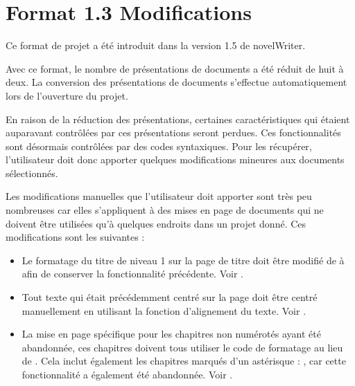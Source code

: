 \documentclass[a4paper,11pt,french]{sphinxmanual}
\begin{document}
\section{Format 1.3 Modifications}
\label{\detokenize{more_projectformat:format-1-3-changes}}\label{\detokenize{more_projectformat:a-prjfmt-1-3}}
\sphinxAtStartPar
Ce format de projet a été introduit dans la version 1.5 de novelWriter.

\sphinxAtStartPar
Avec ce format, le nombre de présentations de documents a été réduit de huit à deux. La conversion des présentations de documents s’effectue automatiquement lors de l’ouverture du projet.

\sphinxAtStartPar
En raison de la réduction des présentations, certaines caractéristiques qui étaient auparavant contrôlées par ces présentations seront perdues. Ces fonctionnalités sont désormais contrôlées par des codes syntaxiques. Pour les récupérer, l’utilisateur doit donc apporter quelques modifications mineures aux documents sélectionnés.

\sphinxAtStartPar
Les modifications manuelles que l’utilisateur doit apporter sont très peu nombreuses car elles s’appliquent à des mises en page de documents qui ne doivent être utilisées qu’à quelques endroits dans un projet donné. Ces modifications sont les suivantes :

\sphinxAtStartPar
{}
\begin{itemize}
\item {} 
\sphinxAtStartPar
Le formatage du titre de niveau 1 sur la page de titre doit être modifié de  à  afin de conserver la fonctionnalité précédente. Voir {\hyperref[\detokenize{usage_format:a-fmt-head}]{}}.

\item {} 
\sphinxAtStartPar
Tout texte qui était précédemment centré sur la page doit être centré manuellement en utilisant la fonction d’alignement du texte. Voir {\hyperref[\detokenize{usage_format:a-fmt-align}]{}}.

\end{itemize}

\sphinxAtStartPar
{}
\begin{itemize}
\item {} 
\sphinxAtStartPar
La mise en page spécifique pour les chapitres non numérotés ayant été abandonnée, ces chapitres doivent tous utiliser le code de formatage  au lieu de . Cela inclut également les chapitres marqués d’un astérisque : , car cette fonctionnalité a également été abandonnée. Voir {\hyperref[\detokenize{usage_format:a-fmt-head}]{}}.

\end{itemize}
\end{document}
